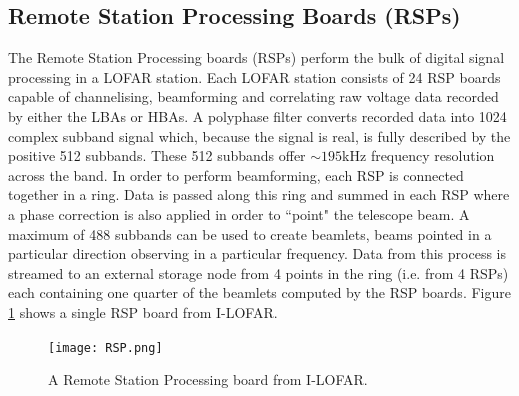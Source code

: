 \subsection{Remote Station Processing Boards (RSPs)}
\label{sec:rsp}
The Remote Station Processing boards (RSPs) perform the bulk of digital signal processing in a LOFAR station. Each LOFAR station consists of 24 RSP boards capable of channelising, beamforming and correlating raw voltage data recorded by either the LBAs or HBAs. A polyphase filter converts recorded data into 1024 complex subband signal which, because the signal is real, is fully described by the positive 512 subbands. These 512 subbands offer $\sim 195$kHz frequency resolution across the band. In order to perform beamforming, each RSP is connected together in a ring. Data is passed along this ring and summed in each RSP where a phase correction is also applied in order to ``point" the telescope beam. A maximum of 488 subbands can be used to create beamlets, beams pointed in a particular direction observing in a particular frequency. Data from this process is streamed to an external storage node from 4 points in the ring (i.e. from 4 RSPs) each containing one quarter of the beamlets computed by the RSP boards. Figure \ref{fig:RSP} shows a single RSP board from I-LOFAR.

\begin{figure}
\centering
\texttt{[image: RSP.png]}
\caption[A Remote Station Processing board.]{A Remote Station Processing board from I-LOFAR.}
\label{fig:RSP}
\end{figure}

